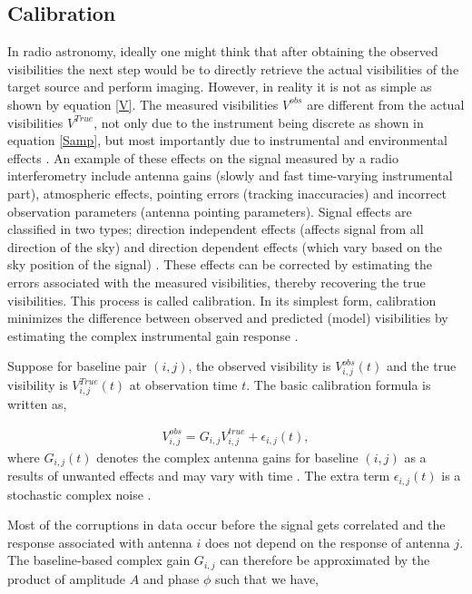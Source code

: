 \subsection{Calibration}
\label{Calib}
In radio astronomy, ideally one might think that after obtaining the observed visibilities the next step would be to directly retrieve the actual visibilities of the target source and perform imaging. However, in reality it is not as simple as shown by equation \ref{V}. The measured visibilities $V^{obs}$ are different from the actual visibilities $V^{True}$, not only due to the instrument being discrete as shown in equation \ref{Samp}, but most importantly due to instrumental and environmental effects \citep{thompson2017interferometry}. An example of these effects on the signal measured by a radio interferometry include antenna gains (slowly and fast time-varying instrumental part), atmospheric effects, pointing errors (tracking inaccuracies) and incorrect observation parameters (antenna pointing parameters). Signal effects are classified in two types; direction independent effects (affects signal from all direction of the sky) and direction dependent effects (which vary based on the sky position of the signal) \citep{taylor1999synthesis}. These effects can be corrected by estimating the errors associated with the measured visibilities, thereby recovering the true visibilities. This process is called calibration. In its simplest form, calibration minimizes the difference between observed and predicted (model) visibilities by estimating the complex instrumental gain response \citep{grobler2016calibration}. 

Suppose for baseline pair $(i,j)$, the observed visibility is $V^{obs}_{i,j}(t)$ and the true visibility is $V^{True}_{i,j}(t)$ at observation time $t$. The basic calibration formula is written as,

\begin{align}
V_{i,j}^{obs}=G_{i,j} V_{i,j}^{true} + \epsilon_{i,j}(t) ,
\end{align}
where $G_{i,j}(t)$ denotes the complex antenna gains for baseline $(i,j)$ as a results of unwanted effects and may vary with time \citep{thompson2001interferometry}. The extra term $ \epsilon_{i,j}(t)$ is a stochastic complex noise \citep{taylor1999synthesis}.

Most of the corruptions in data occur before the signal gets correlated and the response associated with antenna  $i$  does not depend on the response of antenna $j$. The baseline-based complex gain $G_{i,j}$ can therefore be approximated by the product of amplitude $A$ and phase $\phi$ such that we have,  

